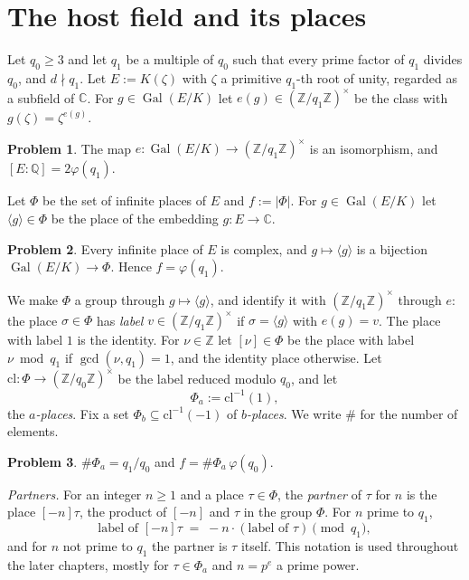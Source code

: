 \documentclass[reqno]{amsart}
\newcounter{chap}
\theoremstyle{definition}
\newtheorem{problem}{Problem}[section]
\theoremstyle{plain}
\newcommand{\Z}{\mathbb{Z}}
\newcommand{\Q}{\mathbb{Q}}
\newcommand{\C}{\mathbb{C}}
\newcommand{\Gal}{\operatorname{Gal}}
\begin{document}
\section{The host field and its places}\label{sec:places}

Let \(q_0 \ge 3\) and let \(q_1\) be a multiple of \(q_0\) such that every prime factor of \(q_1\) divides \(q_0\), and \(d \nmid q_1\).  Let \(E := K(\zeta)\) with \(\zeta\) a primitive \(q_1\)-th root of unity, regarded as a subfield of \(\C\).  For \(g \in \Gal(E/K)\) let \(e(g) \in (\Z/q_1\Z)^\times\) be the class with \(g(\zeta) = \zeta^{e(g)}\).

\begin{problem}\label{pr:galois}
The map \(e \colon \Gal(E/K) \to (\Z/q_1\Z)^\times\) is an isomorphism, and \([E : \Q] = 2\varphi(q_1)\).
\end{problem}

Let \(\Phi\) be the set of infinite places of \(E\) and \(f := \lvert \Phi \rvert\).  For \(g \in \Gal(E/K)\) let \(\langle g \rangle \in \Phi\) be the place of the embedding \(g \colon E \to \C\).

\begin{problem}\label{pr:cm-type}
Every infinite place of \(E\) is complex, and \(g \mapsto \langle g \rangle\) is a bijection \(\Gal(E/K) \to \Phi\).  Hence \(f = \varphi(q_1)\).
\end{problem}

We make \(\Phi\) a group through \(g \mapsto \langle g \rangle\), and identify it with \((\Z/q_1\Z)^\times\) through \(e\): the place \(\sigma \in \Phi\) has \emph{label} \(v \in (\Z/q_1\Z)^\times\) if \(\sigma = \langle g \rangle\) with \(e(g) = v\).  The place with label \(1\) is the identity.  For \(\nu \in \Z\) let \([\nu] \in \Phi\) be the place with label \(\nu \bmod q_1\) if \(\gcd(\nu, q_1) = 1\), and the identity place otherwise.  Let \(\mathrm{cl} \colon \Phi \to (\Z/q_0\Z)^\times\) be the label reduced modulo \(q_0\), and let
\[
  \Phi_a := \mathrm{cl}^{-1}(1) ,
\]
the \emph{\(a\)-places}.  Fix a set \(\Phi_b \subseteq \mathrm{cl}^{-1}(-1)\) of \emph{\(b\)-places}.  We write \(\#\) for the number of elements.

\begin{problem}\label{pr:fibres}
\(\#\Phi_a = q_1/q_0\) and \(f = \#\Phi_a\, \varphi(q_0)\).
\end{problem}

\emph{Partners.}  For an integer \(n \ge 1\) and a place \(\tau \in \Phi\), the \emph{partner} of \(\tau\) for \(n\) is the place \([-n]\tau\), the product of \([-n]\) and \(\tau\) in the group \(\Phi\).  For \(n\) prime to \(q_1\),
\[
  \text{label of } [-n]\tau \;=\; -n \cdot (\text{label of } \tau) \pmod{q_1} ,
\]
and for \(n\) not prime to \(q_1\) the partner is \(\tau\) itself.  This notation is used throughout the later chapters, mostly for \(\tau \in \Phi_a\) and \(n = p^e\) a prime power.
\end{document}
